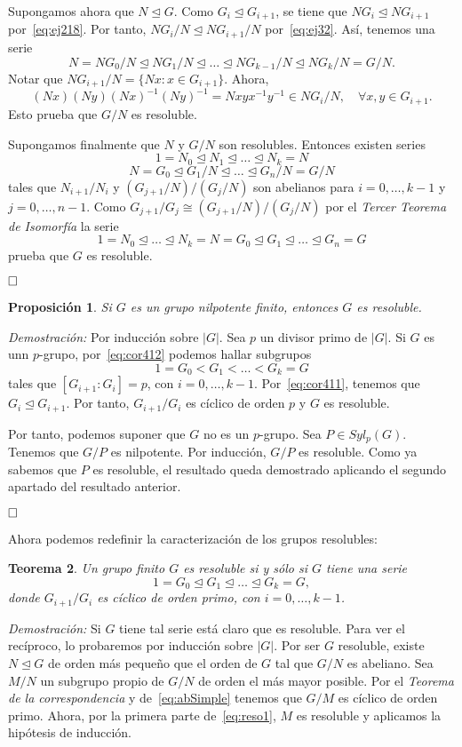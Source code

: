 \documentclass[12pt]{article}
\newtheorem{theorem}{Teorema}[section]
\newtheorem{proposition}[theorem]{Proposición}
\begin{document}
Supongamos ahora que $N \unlhd G$. Como $G_i \unlhd G_{i+1}$, se tiene que $NG_i \unlhd NG_{i+1}$ por~\ref{eq:ej218}. Por tanto, $NG_i/N \unlhd NG_{i+1}/N$ por~\ref{eq:ej32}. Así, tenemos una serie $$N = NG_0/N \unlhd NG_1/N \unlhd \ldots \unlhd NG_{k-1}/N \unlhd NG_k/N = G/N.$$ Notar que $NG_{i+1}/N = \lbrace Nx : x \in G_{i+1} \rbrace$. Ahora, $$(Nx)(Ny)(Nx)^{-1}(Ny)^{-1} = Nxyx^{-1}y^{-1} \in NG_i/N, \quad \forall x,y \in G_{i+1}.$$ Esto prueba que $G/N$ es resoluble. 

Supongamos finalmente que $N$ y $G/N$ son resolubles. Entonces existen series $$1 = N_0 \unlhd N_1 \unlhd \ldots \unlhd N_k = N$$ $$N = G_0 \unlhd G_1/N \unlhd \ldots \unlhd G_n/N = G/N$$ tales que $N_{i+1}/N_i$ y $(G_{j+1}/N)/(G_j/N)$ son abelianos para $i = 0, \ldots, k-1$ y $j = 0, \ldots, n-1$. Como $G_{j+1}/G_j \cong (G_{j+1}/N)/(G_j/N)$ por el \textit{Tercer Teorema de Isomorfía} la serie $$1 = N_0 \unlhd \ldots \unlhd N_k = N = G_0 \unlhd G_1 \unlhd \ldots \unlhd G_n = G$$ prueba que $G$ es resoluble.

$\hfill \square$

\begin{proposition}Si $G$ es un grupo nilpotente finito, entonces $G$ es resoluble.
\end{proposition}
\emph{Demostración: }Por inducción sobre $|G|$. Sea $p$ un divisor primo de $|G|$. Si $G$ es unn $p$-grupo, por~\ref{eq:cor412} podemos hallar subgrupos $$1 = G_0 < G_1 <\ldots < G_k = G$$ tales que $[G_{i+1}:G_i] = p$, con $i=0, \ldots, k-1$. Por~\ref{eq:cor411}, tenemos que $G_i \unlhd G_{i+1}$. Por tanto, $G_{i+1}/G_i$ es cíclico de orden $p$ y $G$ es resoluble. 

Por tanto, podemos suponer que $G$ no es un $p$-grupo. Sea $P \in Syl_p(G)$. Tenemos que $G/P$ es nilpotente. Por inducción, $G/P$ es resoluble. Como ya sabemos que $P$ es resoluble, el resultado queda demostrado aplicando el segundo apartado del resultado anterior. 

$\hfill \square$

Ahora podemos redefinir la caracterización de los grupos resolubles: 

\begin{theorem}
Un grupo finito $G$ es resoluble si y sólo si $G$ tiene una serie $$1 = G_0 \unlhd G_1 \unlhd \ldots \unlhd G_k =G,$$ donde $G_{i+1}/G_i$ es cíclico de orden primo, con $i= 0, \ldots, k-1$.
\end{theorem}
\emph{Demostración: }Si $G$ tiene tal serie está claro que es resoluble. Para ver el recíproco, lo probaremos por inducción sobre $|G|$. Por ser $G$ resoluble, existe $N \unlhd G$ de orden más pequeño que el orden de $G$ tal que $G/N$ es abeliano. Sea $M/N$ un subgrupo propio de $G/N$ de orden el más mayor posible. Por el \textit{Teorema de la correspondencia} y de~\ref{eq:abSimple} tenemos que $G/M$ es cíclico de orden primo. Ahora, por la primera parte de~\ref{eq:reso1}, $M$ es resoluble y aplicamos la hipótesis de inducción.
\end{document}
